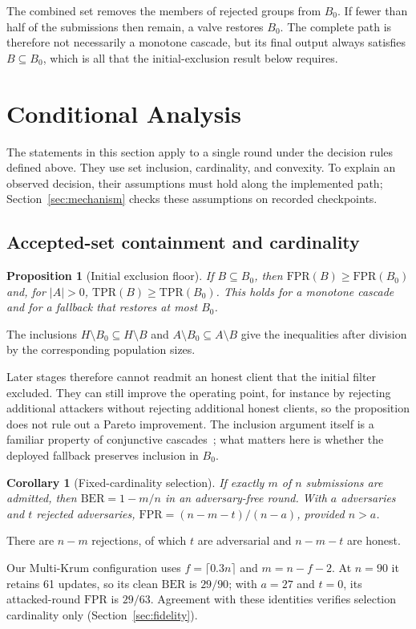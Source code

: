 \documentclass[journal]{IEEEtran}
\newtheorem{proposition}{Proposition}
\newtheorem{corollary}{Corollary}
\newcommand{\BER}{\mathrm{BER}}
\begin{document}
The combined set removes the members of rejected groups from $B_0$. If fewer than half of the submissions then remain, a valve restores $B_0$. The complete path is therefore not necessarily a monotone cascade, but its final output always satisfies $B\subseteq B_0$, which is all that the initial-exclusion result below requires.

\section{Conditional Analysis}\label{sec:theory}
The statements in this section apply to a single round under the decision rules defined above. They use set inclusion, cardinality, and convexity. To explain an observed decision, their assumptions must hold along the implemented path; Section~\ref{sec:mechanism} checks these assumptions on recorded checkpoints.

\subsection{Accepted-set containment and cardinality}
\begin{proposition}[Initial exclusion floor]\label{prop:floor}
If $B\subseteq B_0$, then $\mathrm{FPR}(B)\geq\mathrm{FPR}(B_0)$ and, for $|A|>0$, $\mathrm{TPR}(B)\geq\mathrm{TPR}(B_0)$. This holds for a monotone cascade and for a fallback that restores at most $B_0$.
\end{proposition}
\begin{IEEEproof}
The inclusions $H\setminus B_0\subseteq H\setminus B$ and $A\setminus B_0\subseteq A\setminus B$ give the inequalities after division by the corresponding population sizes.
\end{IEEEproof}
Later stages therefore cannot readmit an honest client that the initial filter excluded. They can still improve the operating point, for instance by rejecting additional attackers without rejecting additional honest clients, so the proposition does not rule out a Pareto improvement. The inclusion argument itself is a familiar property of conjunctive cascades~\cite{viola2004cascade}; what matters here is whether the deployed fallback preserves inclusion in $B_0$.

\begin{corollary}[Fixed-cardinality selection]\label{cor:cardinality}
If exactly $m$ of $n$ submissions are admitted, then $\BER=1-m/n$ in an adversary-free round. With $a$ adversaries and $t$ rejected adversaries, $\mathrm{FPR}=(n-m-t)/(n-a)$, provided $n>a$.
\end{corollary}
\begin{IEEEproof}
There are $n-m$ rejections, of which $t$ are adversarial and $n-m-t$ are honest.
\end{IEEEproof}
Our Multi-Krum configuration uses $f=\lceil0.3n\rceil$ and $m=n-f-2$. At $n=90$ it retains 61 updates, so its clean $\BER$ is $29/90$; with $a=27$ and $t=0$, its attacked-round $\mathrm{FPR}$ is $29/63$. Agreement with these identities verifies selection cardinality only (Section~\ref{sec:fidelity}).
\end{document}
